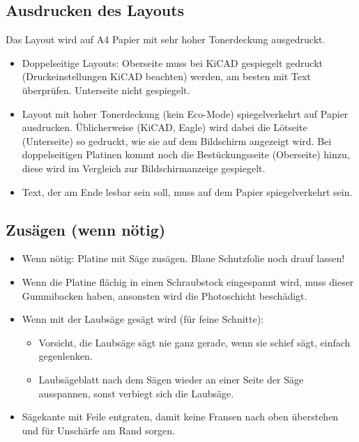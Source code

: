 \documentclass{\basedir/fablab-document}
\begin{document}
\subsection{Ausdrucken des Layouts}
\label{sec:ausdrucken}
Das Layout wird auf A4 Papier mit sehr hoher Tonerdeckung ausgedruckt.
\begin{itemize}
\item Doppelseitige Layouts: Oberseite muss bei KiCAD gespiegelt gedruckt (Druckeinstellungen KiCAD beachten) werden, am besten mit Text überprüfen. Unterseite nicht gespiegelt.
\item Layout mit hoher Tonerdeckung (kein Eco-Mode) spiegelverkehrt auf Papier ausdrucken. Üblicherweise (KiCAD, Eagle) wird dabei die Lötseite (Unterseite) so gedruckt, wie sie auf dem Bildschirm angezeigt wird. Bei doppelseitigen Platinen kommt noch die Bestückungsseite (Oberseite) hinzu, diese wird im Vergleich zur Bildschirmanzeige gespiegelt.
\item Text, der am Ende lesbar sein soll, muss auf dem Papier spiegelverkehrt sein.
\end{itemize}


\subsection{Zusägen (wenn nötig)}
\label{sec:zusaegen}
\begin{itemize}
\item Wenn nötig: Platine mit Säge zusägen. Blaue Schutzfolie noch drauf lassen!
\end{itemize}
\begin{itemize}
\item Wenn die Platine flächig in einen Schraubstock eingespannt wird, muss dieser Gummibacken haben, ansonsten wird die Photoschicht beschädigt.
\item Wenn mit der Laubsäge gesägt wird (für feine Schnitte):
	\begin{itemize}
	\item Vorsicht, die Laubsäge sägt nie ganz gerade, wenn sie schief sägt, einfach gegenlenken.
	\item Laubsägeblatt nach dem Sägen wieder an einer Seite der Säge ausspannen, sonst verbiegt sich die Laubsäge.
	\end{itemize}
\item Sägekante mit Feile entgraten, damit keine Fransen nach oben überstehen und für Unschärfe am Rand sorgen.
\end{itemize}
\end{document}
